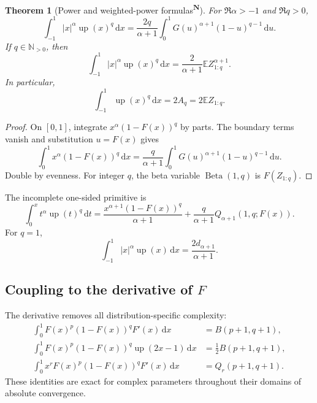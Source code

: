 \documentclass[11pt,oneside]{article}
\newtheorem{theorem}{Theorem}[section]
\theoremstyle{definition}
\theoremstyle{remark}
\newcommand{\F}{F}
\newcommand{\G}{G}
\newcommand{\Up}{\operatorname{up}}
\newcommand{\E}{\mathbb E}
\newcommand{\N}{\mathbb N}
\newcommand{\dd}{\,\mathrm d}
\newcommand{\Beta}{\operatorname{Beta}}
\newcommand{\tagnew}{\textsuperscript{\textcolor{oliveink}{\bfseries N}}}
\begin{document}
\begin{theorem}[Power and weighted-power formulas\tagnew]\label{thm:uppowers}
For \(\Re\alpha>-1\) and \(\Re q>0\),
\begin{equation}\label{eq:uppower}
 \boxed{
 \int_{-1}^1|x|^\alpha\Up(x)^q\dd x
 =\frac{2q}{\alpha+1}
 \int_0^1\G(u)^{\alpha+1}(1-u)^{q-1}\dd u.}
\end{equation}
If \(q\in\N_{>0}\), then
\begin{equation}\label{eq:upmin}
 \int_{-1}^1|x|^\alpha\Up(x)^q\dd x
 =\frac2{\alpha+1}\E Z_{1:q}^{\alpha+1}.
\end{equation}
In particular,
\begin{equation}\label{eq:upLp}
 \int_{-1}^1\Up(x)^q\dd x=2A_q=2\E Z_{1:q}.
\end{equation}
\end{theorem}

\begin{proof}
On \([0,1]\), integrate \(x^\alpha(1-\F(x))^q\) by parts.  The boundary terms
vanish and substitution \(u=\F(x)\) gives
\[
 \int_0^1x^\alpha(1-\F(x))^q\dd x
 =\frac{q}{\alpha+1}\int_0^1\G(u)^{\alpha+1}(1-u)^{q-1}\dd u.
\]
Double by evenness.  For integer \(q\), the beta variable
\(\Beta(1,q)\) is \(\F(Z_{1:q})\).
\end{proof}

The incomplete one-sided primitive is
\begin{equation}\label{eq:upincomplete}
 \int_0^x t^\alpha\Up(t)^q\dd t
 =\frac{x^{\alpha+1}(1-\F(x))^q}{\alpha+1}
 +\frac{q}{\alpha+1}Q_{\alpha+1}(1,q;\F(x)).
\end{equation}
For \(q=1\),
\begin{equation}
 \int_{-1}^1|x|^\alpha\Up(x)\dd x
 =\frac{2d_{\alpha+1}}{\alpha+1}.
\end{equation}

\subsection{Coupling to the derivative of \(\F\)}

The derivative removes all distribution-specific complexity:
\begin{align}
 \int_0^1\F(x)^p(1-\F(x))^q\F'(x)\dd x
 &=B(p+1,q+1),\label{eq:Fprimebeta}\\
 \int_0^1\F(x)^p(1-\F(x))^q\Up(2x-1)\dd x
 &=\frac12B(p+1,q+1),\label{eq:upcoupling}\\
 \int_0^1x^r\F(x)^p(1-\F(x))^q\F'(x)\dd x
 &=Q_r(p+1,q+1).\label{eq:weightedFprime}
\end{align}
These identities are exact for complex parameters throughout their domains of
absolute convergence.
\end{document}

